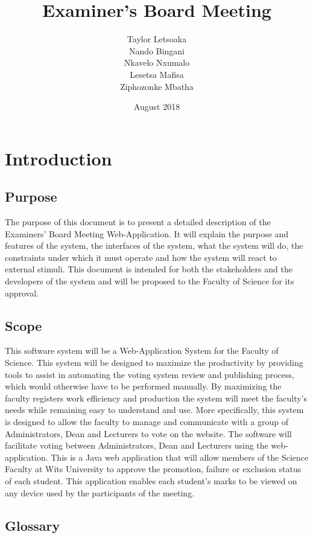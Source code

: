 \documentclass{article}
\title{Examiner's Board Meeting}
\author{Taylor Letsoaka\\Nando Bingani\\Nkavelo Nxumalo\\Lesetsa Mafisa\\Ziphozonke Mbatha}
\date{August 2018}
\begin{document}
\maketitle
\clearpage
\tableofcontents
\newpage



\section{Introduction}
\subsection{Purpose}
\large{The purpose of this document is to present a detailed description of the Examiners' Board Meeting Web-Application. It will explain the purpose and features of the system, the interfaces of the system, what the system will do, the constraints under which it must operate and how the system will react to external stimuli. This document is intended for both the stakeholders and the developers of the system and will be proposed to the Faculty of Science for its approval.}

\subsection{Scope}
\large{This software system will be a Web-Application System for the Faculty of Science. This system will be designed to maximize the productivity by providing tools to assist in automating the voting system review and publishing process, which would otherwise have to be performed manually. By maximizing the faculty registers work efficiency and production the system will meet the faculty’s needs while remaining easy to understand and use. More specifically, this system is designed to allow the faculty to manage and communicate with a group of Administrators, Dean and Lecturers  to vote on the website. The software will facilitate voting between Administrators, Dean and Lecturers using the web-application. This is a Java web application that will allow members of the Science Faculty at Wits University to approve the promotion, failure or exclusion status of each student.
This application enables each student's marks to be viewed on any device used by the participants of the meeting.}

\subsection{Glossary}
\end{document}
